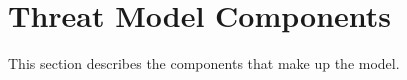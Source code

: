 \section{\unclass Threat Model Components}


\classlabelshort This section describes the components that make up the \modelname{} model.